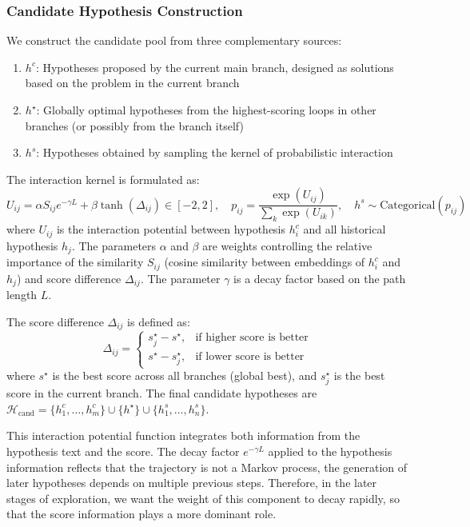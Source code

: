 \subsubsection{Candidate Hypothesis Construction}

We construct the candidate pool from three complementary sources:
\begin{enumerate}
    \item $h^c$: Hypotheses proposed by the current main branch, designed as solutions based on the problem in the current branch
    \item $h^{\star}$: Globally optimal hypotheses from the highest-scoring loops in other branches (or possibly from the branch itself)
    \item $h^s$: Hypotheses obtained by sampling the kernel of probabilistic interaction
\end{enumerate}

The interaction kernel is formulated as:
\begin{equation}
U_{ij} = \alpha S_{ij} e^{-\gamma L} + \beta \tanh(\Delta_{ij}) \in [-2,2], \quad
p_{ij} = \frac{\exp(U_{ij})}{\sum_k \exp(U_{ik})}, \quad
h^s \sim \text{Categorical}( p_{ij})
\end{equation}
where $U_{ij}$ is the interaction potential between hypothesis $h_i^c$ and all historical hypothesis $h_j$. The parameters $\alpha$ and $\beta$ are weights controlling the relative importance of the similarity $S_{ij}$ (cosine similarity between embeddings of $h_i^c$ and $h_j$) and score difference $\Delta_{ij}$. The parameter $\gamma$ is a decay factor based on the path length $L$.

The score difference $\Delta_{ij}$ is defined as:
\begin{equation}
\Delta_{ij} = 
\begin{cases}
s_j^{\star} - s^{\star}, & \text{if higher score is better} \\
s^{\star} - s_j^{\star}, & \text{if lower score is better}    
\end{cases}
\end{equation}
where $s^{\star}$ is the best score across all branches (global best), and $s_j^{\star}$ is the best score in the current branch. The final candidate hypotheses are $\mathcal{H}_{\text{cand}} = \{h_1^c, \dots, h^c_m\} \cup \{h^\star\} \cup \{h_1^s, \dots, h^s_n\}$. 

This interaction potential function integrates both information from the hypothesis text and the score. The decay factor $e^{-\gamma L}$ applied to the hypothesis information reflects that the trajectory is not a Markov process, the generation of later hypotheses depends on multiple previous steps. Therefore, in the later stages of exploration, we want the weight of this component to decay rapidly, so that the score information plays a more dominant role.

